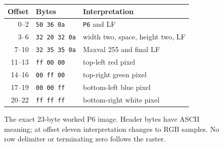 \begin{figure}[htbp]
  \centering
  \begin{tabular}{r l l}
    \toprule
    Offset & Bytes                & Interpretation                   \\
    \midrule
    0--2   & \texttt{50 36 0a}    & \texttt{P6} and LF               \\
    3--6   & \texttt{32 20 32 0a} & width two, space, height two, LF \\
    7--10  & \texttt{32 35 35 0a} & Maxval 255 and final LF          \\
    11--13 & \texttt{ff 00 00}    & top-left red pixel               \\
    14--16 & \texttt{00 ff 00}    & top-right green pixel            \\
    17--19 & \texttt{00 00 ff}    & bottom-left blue pixel           \\
    20--22 & \texttt{ff ff ff}    & bottom-right white pixel         \\
    \bottomrule
  \end{tabular}
  \caption{The exact 23-byte worked P6 image. Header bytes have ASCII meaning; at offset eleven interpretation changes to RGB samples. No row delimiter or terminating zero follows the raster.}
  \label{fig:revision-ppm-layout}
\end{figure}
